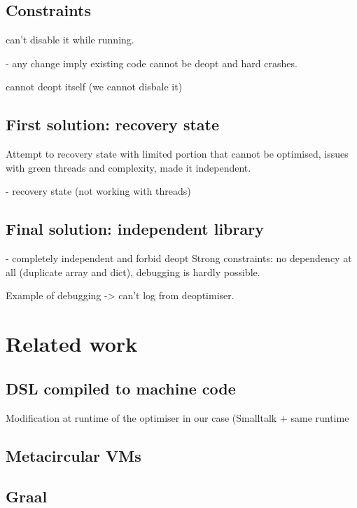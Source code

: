 \documentclass[a4paper,12pt,twoside]{../includes/ThesisStyle}
\begin{document}
\subsection{Constraints}
can't disable it while running. 

- any change imply existing code cannot be deopt and hard crashes.

cannot deopt itself (we cannot disbale it)

\subsection{First solution: recovery state}
 Attempt to recovery state with limited portion that cannot be optimised, issues with green threads and complexity, made it independent.

- recovery state (not working with threads)

\subsection{Final solution: independent library}

- completely independent and forbid deopt
Strong constraints: no dependency at all (duplicate array and dict), debugging is hardly possible.


Example of debugging -> can't log from deoptimiser. 

\section{Related work}

\subsection{DSL compiled to machine code}

Modification at runtime of the optimiser in our case (Smalltalk + same runtime

\subsection{Metacircular VMs}

\subsection{Graal}

\ifx\wholebook\relax\else
    
\end{document}

